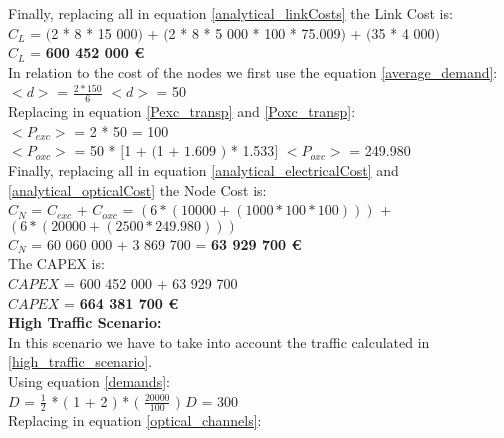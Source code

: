 Finally, replacing all in equation \ref{analytical_linkCosts} the Link Cost is:\\

$C_L$ = $($2 * 8 * 15 000$)$ + $($2 * 8 * 5 000 * 100 * 75.009$)$ + $($35 * 4 000$)$\\

$C_L$ = \textbf{600 452 000 \euro}\\

In relation to the cost of the nodes we first use the equation \ref{average_demand}:\\

$<d>$ = $\frac{2 * 150}{6}$ \qquad \qquad $<d>$ = 50\\

Replacing in equation \ref{Pexc_transp} and \ref{Poxc_transp}:\\

$<P_{exc}>$ = 2 * 50 = 100\\

$<P_{oxc}>$ = 50 * $[$1 + $($1 + $1.609$ $)$ * 1.533$]$ \qquad \quad $<P_{oxc}>$ = 249.980 \\

Finally, replacing all in equation \ref{analytical_electricalCost} and \ref{analytical_opticalCost} the Node Cost is:\\

$C_N$ = $C_{exc}$ + $C_{oxc}$ = $\left( 6*(10 000 + (1 000 * 100 * 100 ) ) \right)$ + $\left(6*(20 000 + (2 500 * 249.980 ) ) \right)$\\

$C_N$ = 60 060 000 + 3 869 700 = \textbf{63 929 700 \euro}\\

The CAPEX is:\\
$CAPEX$ = 600 452 000 + 63 929 700\\

$CAPEX$ = \textbf{664 381 700 \euro}\\


\textbf{High Traffic Scenario:}\\
In this scenario we have to take into account the traffic calculated in \ref{high_traffic_scenario}.\\

Using equation \ref{demands}:\\

$D$ = $\frac{1}{2}$ * $($ 1 + 2 $)$ * $($ $\frac{20000}{100}$ $)$ \qquad \qquad $D$ = 300\\

Replacing in equation \ref{optical_channels}:\\

